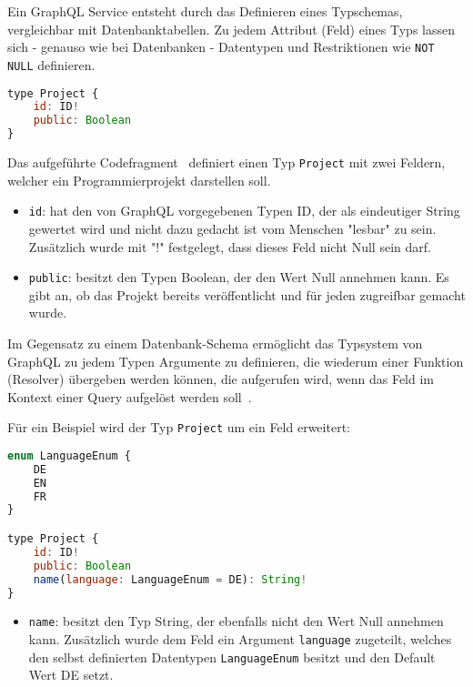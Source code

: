 Ein GraphQL Service entsteht durch das Definieren eines Typschemas, vergleichbar mit Datenbanktabellen. Zu jedem Attribut (Feld) eines Typs lassen sich - genauso wie bei Da\-tenban\-ken -
Datentypen und Restriktionen wie \texttt{NOT NULL} definieren.

\begin{lstlisting}[language=Javascript,float=h!,caption={Project Typdefinition}, label={fig:basics:graphql:1}]
type Project {
    id: ID!
    public: Boolean
}
\end{lstlisting}

Das aufgeführte Codefragment~ definiert einen Typ \texttt{Project} mit zwei Feldern, welcher ein Programmierprojekt darstellen soll.

\begin{itemize}
	\setlength\itemsep{-1em}
    \item \texttt{id}: hat den von GraphQL vorgegebenen Typen ID, der als eindeutiger String gewertet wird und nicht dazu gedacht ist vom Menschen "lesbar" zu sein.
    Zusätzlich wurde mit "!" festgelegt, dass dieses Feld nicht Null sein darf.
    \item \texttt{public}: besitzt den Typen Boolean, der den Wert Null annehmen kann.
    Es gibt an, ob das Projekt bereits veröffentlicht und für jeden zugreifbar gemacht wurde.
\end{itemize}

Im Gegensatz zu einem Datenbank-Schema ermöglicht das Typsystem von GraphQL zu jedem Typen Argumente zu definieren,
die wiederum einer Funktion (Resolver) übergeben werden können,
die aufgerufen wird, wenn das Feld im Kontext einer Query aufgelöst werden soll~\cite{graphql-resolver}.

Für ein Beispiel wird der Typ \texttt{Project} um ein Feld erweitert:

\begin{lstlisting}[language=Javascript,float=h!,caption={Erweiterung der Typdefinition von Project und Einführung eines Enums mit Ländercodes}, label={fig:basics:graphql:2}]
enum LanguageEnum {
    DE
    EN
    FR
}

type Project {
    id: ID!
    public: Boolean
    name(language: LanguageEnum = DE): String!
}
\end{lstlisting}

\begin{itemize}
	\setlength\itemsep{-1em}
    \item \texttt{name}: besitzt den Typ String, der ebenfalls nicht den Wert Null annehmen kann. Zusätzlich wurde dem Feld ein Argument \texttt{language} zugeteilt,
    welches den selbst definierten Datentypen \texttt{LanguageEnum} besitzt und den Default Wert DE setzt.
\end{itemize}


